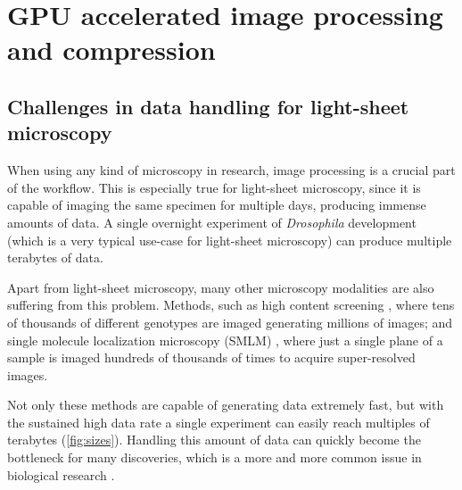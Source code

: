 

\chapter{GPU accelerated image processing and compression}
\label{ch:GPU}
\graphicspath{{./figures/4_gpu/}}


\section{Challenges in data handling for light-sheet microscopy}

  
  \label{sec:sizes}

  When using any kind of microscopy in research, image processing is a crucial part of the workflow. This is especially true for light-sheet microscopy, since it is capable of imaging the same specimen for multiple days, producing immense amounts of data. A single overnight experiment of \textit{Drosophila} development (which is a very typical use-case for light-sheet microscopy) can produce multiple terabytes of data.

  Apart from light-sheet microscopy, many other microscopy modalities are also suffering from this problem. Methods, such as high content screening \cite{carpenter_systematic_2004,echeverri_high-throughput_2006,pepperkok_high-throughput_2006}, where tens of thousands of different genotypes are imaged generating millions of images; and single molecule localization microscopy (SMLM) \cite{betzig_imaging_2006,hess_ultra-high_2006,rust_sub-diffraction-limit_2006}, where just a single plane of a sample is imaged hundreds of thousands of times to acquire super-resolved images.

  Not only these methods are capable of generating data extremely fast, but with the sustained high data rate a single experiment can easily reach multiples of terabytes (\autoref{fig:sizes}). Handling this amount of data can quickly become the bottleneck for many discoveries, which is a more and more common issue in biological research \cite{wollman_high_2007,reynaud_guide_2015,perkel_struggle_2016}. 


